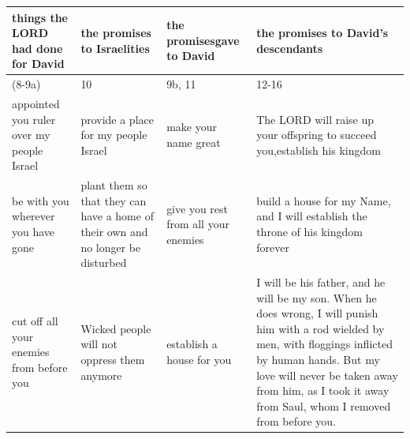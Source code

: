 \begin{table}[H]\centering
\begin{tabular}{p{3.75cm}|p{3cm}|p{2.75cm}|p{5.25cm}}\hline\hline
 things the LORD had done for David&the promises to Israelities&the promisesgave to David&the promises to David's descendants\\\hline
(8-9a) &10&9b, 11&12-16\\\hline
appointed you ruler over my people Israel&provide a place for my people Israel&make your name great&The LORD will raise up your offspring to succeed you,establish his kingdom\\\hline
be with you wherever you have gone&plant them so that they can have a home of their own and no longer be disturbed&give you rest from all your enemies&build a house for my Name, and I will establish the throne of his kingdom forever\\\hline
cut off all your enemies from before you&Wicked people will not oppress them anymore&establish a house for you&I will be his father, and he will be my son. When he does wrong, I will punish him with a rod wielded by men, with floggings inflicted by human hands. But my love will never be taken away from him, as I took it away from Saul, whom I removed from before you. \\\hline
\end{tabular}
\end{table}













